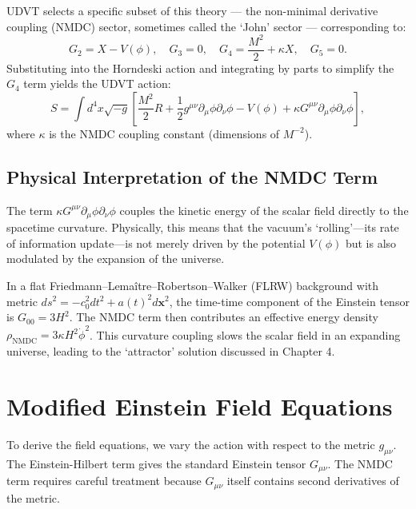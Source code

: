 \documentclass[12pt,a4paper]{book}
\theoremstyle{definition}
\theoremstyle{remark}
\begin{document}
UDVT selects a specific subset of this theory --- the non-minimal derivative coupling (NMDC) sector, sometimes called the `John' sector --- corresponding to:
\begin{equation}
    G_2 = X - V(\phi), \quad G_3 = 0, \quad G_4 = \frac{M^2}{2} + \kappa X, \quad G_5 = 0.
\end{equation}
Substituting into the Horndeski action and integrating by parts to simplify the $G_4$ term yields the UDVT action:
\begin{equation}
    S = \int d^4x \sqrt{-g} \left[ \frac{M^2}{2}R + \frac{1}{2}g^{\mu\nu}\partial_\mu\phi\partial_\nu\phi - V(\phi) + \kappa G^{\mu\nu}\partial_\mu\phi\partial_\nu\phi \right],
\end{equation}
where $\kappa$ is the NMDC coupling constant (dimensions of $M^{-2}$).

\subsection{Physical Interpretation of the NMDC Term}

The term $\kappa G^{\mu\nu}\partial_\mu\phi\partial_\nu\phi$ couples the kinetic energy of the scalar field directly to the spacetime curvature. Physically, this means that the vacuum's `rolling'---its rate of information update---is not merely driven by the potential $V(\phi)$ but is also modulated by the expansion of the universe.

In a flat Friedmann--Lema\^itre--Robertson--Walker (FLRW) background with metric $ds^2 = -c_0^2 dt^2 + a(t)^2 d\mathbf{x}^2$, the time-time component of the Einstein tensor is $G_{00} = 3H^2$. The NMDC term then contributes an effective energy density $\rho_{\mathrm{NMDC}} = 3\kappa H^2 \dot{\phi}^2$. This curvature coupling slows the scalar field in an expanding universe, leading to the `attractor' solution discussed in Chapter 4.

\section{Modified Einstein Field Equations}

To derive the field equations, we vary the action with respect to the metric $g_{\mu\nu}$. The Einstein-Hilbert term gives the standard Einstein tensor $G_{\mu\nu}$. The NMDC term requires careful treatment because $G_{\mu\nu}$ itself contains second derivatives of the metric.
\end{document}
